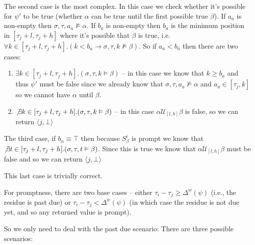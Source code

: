 \documentclass[10pt,a4paper]{article}
\newcommand{\rp}[2]{\ensuremath{\langle #1, #2 \rangle}}
\begin{document}
The second case is the most complex. In this case we check whether it's possible for $\psi'$ to be true (whether $\alpha$ can be true until the first possible true $\beta$).
If $a_a$ is non-empty then $\sigma, \tau, a_a \nvDash \alpha$. If $b_a$ is non-empty then $b_a$ is the minimum position in $[\tau_j+l,\tau_j+h]$ where it's possible that $\beta$ is true, i.e. $\forall k \in [\tau_j+l,\tau_j+h].(k < b_a \rightarrow \sigma, \tau, k \nvDash \beta)$.
So if $a_a < b_a$ then there are two cases: 
\begin{enumerate}
\item $\exists k \in [\tau_j+l,\tau_j+h].(\sigma,\tau,k \vDash \beta)$  -- in this case we know that $k \geq b_a$ and thus $\psi'$ must be false since we already know that $\sigma,\tau,a_a \nvDash \alpha$ and $a_a \in [\tau_j, k]$ so we cannot have $\alpha$ until $\beta$.
\item $\not\exists k \in [\tau_j+l,\tau_j+h].(\sigma,\tau,k \vDash \beta)$ -- in this case $\alpha \mathcal{U}_{[l,h]} \beta$ is false, so we can return $\rp{j}{\bot}$
\end{enumerate}

The third case, if $b_n \equiv \top$ then because $S^i_{\beta}$ is prompt we know that $\not\exists t \in [\tau_j+l,\tau_j+h].(\sigma,\tau,t \vDash \beta)$. 
Since this is true we know that $\alpha \mathcal{U}_{[l,h]} \beta$ must be false and so we can return $\rp{j}{\bot}$

This last case is trivially correct.

For promptness, there are two base cases -- either $\tau_i-\tau_j \geq \Delta^w(\psi)$ (i.e., the residue is past due) or $\tau_i-\tau_j < \Delta^w(\psi)$ (in which case the residue is not due yet, and so any returned value is prompt).

So we only need to deal with the past due scenario: There are three possible scenarios:
\end{document}
